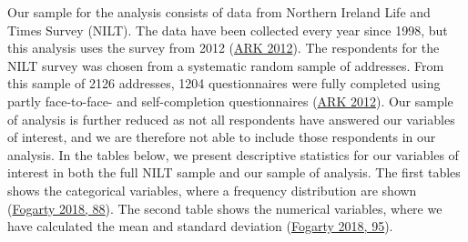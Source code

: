 \documentclass[
]{article}
\begin{document}
Our sample for the analysis consists of data from Northern Ireland Life
and Times Survey (NILT). The data have been collected every year since
1998, but this analysis uses the survey from 2012
(\protect\hyperlink{ref-ark_2012}{ARK 2012}). The respondents for the
NILT survey was chosen from a systematic random sample of addresses.
From this sample of 2126 addresses, 1204 questionnaires were fully
completed using partly face-to-face- and self-completion questionnaires
(\protect\hyperlink{ref-ark_2012}{ARK 2012}). Our sample of analysis is
further reduced as not all respondents have answered our variables of
interest, and we are therefore not able to include those respondents in
our analysis. In the tables below, we present descriptive statistics for
our variables of interest in both the full NILT sample and our sample of
analysis. The first tables shows the categorical variables, where a
frequency distribution are shown
(\protect\hyperlink{ref-fogarty2018quantitative}{Fogarty 2018, 88}). The
second table shows the numerical variables, where we have calculated the
mean and standard deviation
(\protect\hyperlink{ref-fogarty2018quantitative}{Fogarty 2018, 95}).
\end{document}
